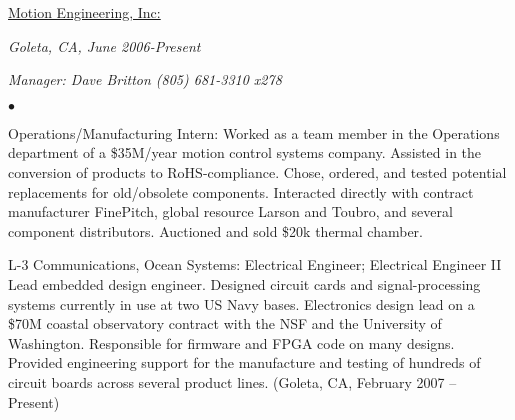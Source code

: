 \documentclass[letterpaper, 11pt]{article}
\begin{document}
\par \smallskip \smallskip
\noindent \underline{Motion Engineering, Inc:} \vspace{0.4em} \\
%
\noindent \begin{minipage}[t]{0.5\textwidth}
\begin{flushleft} 
\textit{Goleta, CA, June 2006-Present}\\
\end{flushleft}
\end{minipage}
\noindent \begin{minipage}[t]{0.5\textwidth}
\begin{flushright} 
\textit{Manager: Dave Britton (805) 681-3310 x278}\\
\end{flushright}
\end{minipage}
%
\noindent \begin{minipage}[t]{\widthof{$\bullet$}}
\begin{flushleft} 
$\bullet$
\end{flushleft}
\end{minipage}
\newskip{\mylength}
\setlength{\mylength}{\widthof{$\bullet$}}%
\noindent \begin{minipage}[t]{\dimexpr \textwidth - 1.2\mylength \relax}
Operations/Manufacturing Intern: Worked as a team member in the Operations department of a \$35M/year motion control systems company. Assisted in the conversion of products to RoHS-compliance. Chose, ordered, and tested potential replacements for old/obsolete components. Interacted directly with contract manufacturer FinePitch, global resource Larson and Toubro, and several component distributors. Auctioned and sold \$20k thermal chamber.
\end{minipage}
\par
\bigskip
{}
\par
L-3 Communications, Ocean Systems:	Electrical Engineer; Electrical Engineer II\\
Lead embedded design engineer. Designed circuit cards and signal-processing systems currently in use at two US Navy bases. Electronics design lead on a \$70M coastal observatory contract with the NSF and the University of Washington. Responsible for firmware and FPGA code on many designs. Provided engineering support for the manufacture and testing of hundreds of circuit boards across several product lines. (Goleta, CA, February 2007 – Present)
\end{document}
